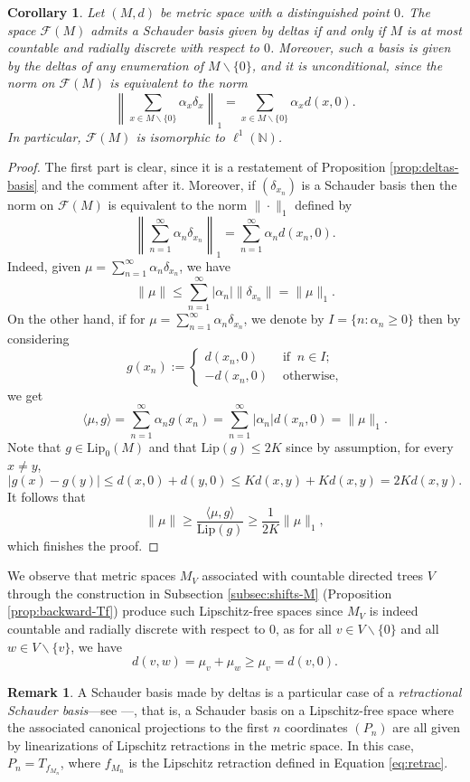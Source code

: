 \documentclass[12pt,english]{amsart}
\numberwithin{equation}{section}
\theoremstyle{plain}
\newtheorem{corollary}[theorem]{Corollary}
\theoremstyle{definition}
\newtheorem{remark}[theorem]{Remark}
\def\NN{\mathbb N}
\def\aa{\alpha}
\newcommand{\free}[1]{\mathcal{F}(#1)}
\def\lip{ \text{Lip}}
\begin{document}
\begin{corollary}\label{cor:delta-basis}
Let $(M,d)$ be metric space with a distinguished point $0$. The space $\mathcal{F}(M)$ admits a Schauder basis given by deltas if and only if $M$ is at most countable and radially discrete with respect to $0$.
Moreover, such a basis is given by the deltas of any  enumeration of $M\backslash\{0\}$, and it is unconditional, since the norm on $\mathcal{F}(M)$ is equivalent to the norm 
\[\left\|\sum_{x\in M\backslash\{0\}}\aa_x \delta_{x}\right\|_1=\sum_{x\in M\backslash\{0\}}\aa_x d(x,0).\]
In particular, $\free{M}$ is isomorphic to $\ell^1(\NN)$.
\end{corollary}
\begin{proof}
The first part is clear, since it is a restatement of Proposition \ref{prop:deltas-basis} and the comment after it. 
Moreover, if $(\delta_{x_n})$ is a Schauder basis then the norm on $\mathcal{F}(M)$ is equivalent to the norm $\|\cdot\|_1$ defined by
\[\left\|\sum_{n=1}^{\infty}\aa_n \delta_{x_n}\right\|_1=\sum_{n=1}^{\infty}\aa_n d(x_n,0).\]
Indeed, given $\mu=\sum_{n=1}^{\infty}\aa_n \delta_{x_n}$, we have
\[\|\mu\|\le \sum_{n=1}^{\infty}|\aa_n| \|\delta_{x_n}\|=\|\mu\|_1.\]
On the other hand, if for $\mu=\sum_{n=1}^{\infty}\aa_n \delta_{x_n}$, we denote by $I=\{n: \aa_n\ge 0\}$ then by considering 
\[g(x_n):=\begin{cases}
   d(x_n,0) &\text{ if }\ n\in I; \\
   -d(x_n,0) &\text{ otherwise},
\end{cases}\]
we get \[\langle \mu, g\rangle= \sum_{n=1}^{\infty}\aa_n g(x_n)=\sum_{n=1}^{\infty}|\aa_n|d(x_n,0)=\|\mu\|_1.\]
Note that $g\in \text{Lip}_0(M)$ and that $\lip(g)\leq 2K$ since by assumption, for every $x\ne y$,
\[|g(x)-g(y)|\le d(x,0)+d(y,0)\leq  Kd(x,y)+Kd(x,y)=2Kd(x,y).\]
It follows that
\[\|\mu\|\geq \frac{\langle \mu, g\rangle}{\text{Lip}(g)}\geq \frac{1}{2K}\|\mu\|_1,\]
which finishes the proof.
\end{proof}


We observe that metric spaces $M_V$ associated with countable directed trees $V$ through the construction in Subsection \ref{subsec:shifts-M} (Proposition \ref{prop:backward-Tf}) produce such Lipschitz-free spaces since $M_V$ is indeed countable and radially discrete with respect to $0$, as for all $v\in V\backslash\{0\}$ and all $w\in V\backslash\{v\}$, we have
        \[d(v,w)=\mu_v+\mu_w\ge \mu_v= d(v,0).\]


\begin{remark}\label{rem:deltas-retract}
    A Schauder basis made by deltas is a particular case of a \textit{retractional Schauder basis}---see \cite{Nov20}---, that is, a Schauder basis on a Lipschitz-free space where the associated canonical projections to the first $n$ coordinates $(P_n)$ are all given by linearizations of Lipschitz retractions in the metric space. In this case, $P_n=T_{f_{M_n}}$, where $f_{M_n}$ is the Lipschitz retraction defined in Equation \eqref{eq:retrac}.
\end{remark}
\end{document}
